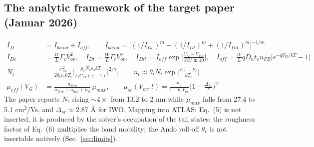 \documentclass[11pt,a4paper]{article}
\begin{document}
\subsection{The analytic framework of the target paper (Januar 2026)}
\begin{align}
I_D &= I_{blend}+I_{off},\qquad I_{blend}=\Big[(1/I_{Dc})^m+(1/I_{Dt})^m+(1/I_{Dit})^m\Big]^{-1/m} \tag{1a,b}\\
I_{Dc}&=\tfrac{W}{L}\Gamma_c V_{ov}^2,\quad I_{Dt}=\tfrac{W}{L}\Gamma_t V_{ov}^{\gamma},\quad I_{Dit}=I_{off}\exp\!\Big[\tfrac{V_G-V_{FB}}{SS/\ln 10}\Big],\quad I_{off}=\tfrac{W}{L}qD_n t_s n_{FB}\big[e^{-qV_D/kT}-1\big] \tag{1c--f}\\
N_t &= \frac{C_{ox}^2}{2\theta_t\varepsilon_s kT_t}\Big[\frac{\mu_c N_c\varepsilon_s kT}{\Gamma_t C_{ox}(\gamma-1)}\Big]^{2/\gamma},\qquad n_t\approx\theta_t N_t\exp\!\Big[\frac{E_F-E_c}{kT_t}\Big] \tag{3, 8}\\
\mu_{eff}(V_G)&=\frac{n_{free}}{n_{free}+n_{tail}+n_{it}}\,\mu_{max},\qquad \mu_{sr}(V_{ov},t)=\frac{\mu_0}{1+\theta_r V_{ov}}\Big(1-\frac{\Delta_{sr}}{t}\Big)^2 \tag{5, 6}
\end{align}
The paper reports $N_t$ rising $\sim4\times$ from 13.2 to 2 nm while $\mu_{max}$ falls from 27.4 to 5.1 cm$^2$/Vs, and $\Delta_{sr}\approx2.87$ \AA{} for IWO. Mapping into ATLAS: Eq.~(5) is not inserted, it is produced by the solver's occupation of the tail states; the roughness factor of Eq.~(6) multiplies the band mobility; the Ando roll-off $\theta_r$ is not insertable natively (Sec.~\ref{sec:limits}).

\end{document}
